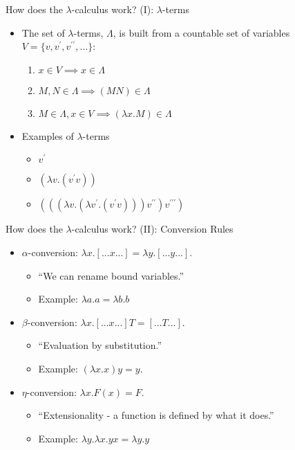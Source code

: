 \documentclass{beamer}
\begin{document}
\begin{frame}{How does the $\lambda$-calculus work? (I): $\lambda$-terms}
\begin{itemize}
\item The set of $\lambda$-terms, $\Lambda$, is built from a countable set of variables $V = \{v, v^\prime, v^{\prime\prime}, \ldots\}$:
\begin{enumerate}
\item $x \in V \implies x \in \Lambda$
\item $M,N \in \Lambda \implies (MN) \in \Lambda$
\item $M \in \Lambda, x\in V \implies (\lambda x . M) \in \Lambda$
\end{enumerate}
\item{Examples of $\lambda$-terms}
\begin{itemize}
\item $v^\prime$
\item $(\lambda v. (v^\prime v))$
\item $(((\lambda v. (\lambda v^\prime . (v^\prime v))) v^{\prime\prime}) v^{\prime\prime\prime})$
\end{itemize}
\end{itemize}
\end{frame}

\begin{frame}{How does the $\lambda$-calculus work? (II): Conversion Rules}
\begin{itemize}
\item $\alpha$-conversion: $\lambda x.[...x...] = \lambda y.[...y...]$.  
  \begin{itemize}
  \item ``We can rename bound variables.''
  \item Example: $\lambda a.a = \lambda b.b$
  \end{itemize}
\item $\beta$-conversion: $\lambda x.[...x...] T = [...T...]$. 
  \begin{itemize}
    \item ``Evaluation by substitution.''
    \item Example: $(\lambda x.x)y = y.$
  \end{itemize}
\item $\eta$-conversion: $\lambda x.F(x) = F$. 
  \begin{itemize}
    \item ``Extensionality - a function is defined by what it does.''
    \item Example: $\lambda y.\lambda x.yx =\lambda y.y$
  \end{itemize}
\end{itemize}
\end{frame}
\end{document}
